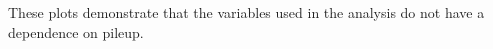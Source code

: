 
These plots demonstrate that the variables used in the analysis do not have a dependence on pileup.

\newpage

